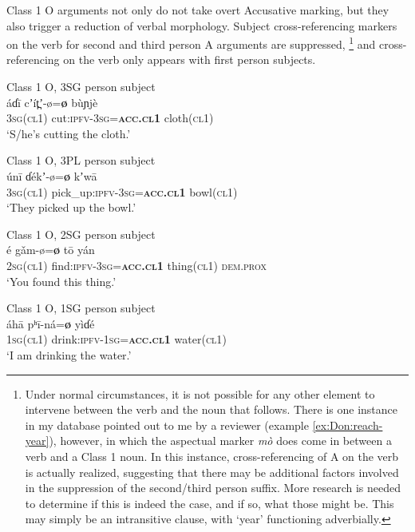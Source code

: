 \documentclass[output=collectionpaper,hidelinks]{langscibook}
\theoremstyle{remark}
\begin{document}
Class 1 O arguments not only do not take overt Accusative marking, but they also
trigger a reduction of verbal morphology.  Subject cross-referencing markers on
the verb for second and third person A arguments are suppressed,%
\footnote{Under normal circumstances, it is not possible for any other element
to intervene between the verb and the noun that follows.  There is one
instance in my database pointed out to me by a reviewer (example
\ref{ex:Don:reach-year}), however, in which the aspectual marker \emph{mò} does
come in between a verb and a Class 1 noun.  In this instance, cross-referencing
of A on the verb is actually realized, suggesting that there may be additional
factors involved in the suppression of the second/third person suffix.  More
research is needed to determine if this is indeed the case, and if so, what
those might be.  This may simply be an intransitive clause, with `year'
functioning adverbially.} %
and cross-referencing on the verb only appears with first person subjects.


\ea
\label{ex:Don:cut-cloth}
Class 1 O, 3SG person subject \\
\gll áɗī cʼít̪ʼ-ø=\textbf{ø} bùɲjè \\
 \textsc{3sg}(\textsc{cl1}) cut:\textsc{ipfv}-\textsc{3sg}=\textbf{\textsc{acc.cl1}} cloth(\textsc{cl1}) \\
\glt `S/he's cutting the cloth.' \\
\z

\ea
\label{ex:Don:pick-bowl}
Class 1 O, 3PL person subject \\
\gll únī ɗékʼ-ø=\textbf{ø} kʼwā \\
 \textsc{3sg}(\textsc{cl1}) pick\_up:\textsc{ipfv}-\textsc{3sg}=\textbf{\textsc{acc.cl1}} bowl(\textsc{cl1}) \\
\glt `They picked up the bowl.' \\
\z

\ea
\label{ex:Don:found-thing}
Class 1 O, 2SG person subject \\
\gll é gǎm-ø=\textbf{ø} tō yán \\
 \textsc{2sg}(\textsc{cl1}) find:\textsc{ipfv}-\textsc{3sg}=\textbf{\textsc{acc.cl1}} thing(\textsc{cl1}) \textsc{dem.prox} \\
\glt `You found this thing.' \\
\z

\ea
 Class 1 O, 1SG person subject \\
\gll áhā pʰī-ná=\textbf{ø} yìɗé \\
 \textsc{1sg}(\textsc{cl1}) drink:\textsc{ipfv}-\textsc{1sg}=\textbf{\textsc{acc.cl1}} water(\textsc{cl1}) \\
\glt `I am drinking the water.' \\
\z
\end{document}
